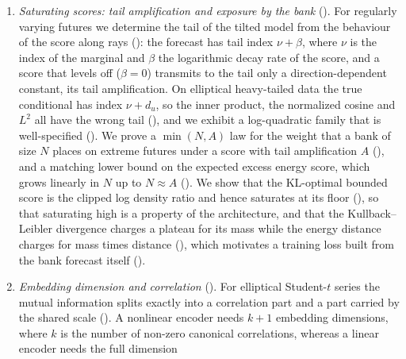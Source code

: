 \documentclass[11pt]{article}
\theoremstyle{plain}
\theoremstyle{definition}
\theoremstyle{remark}
\begin{document}
\begin{enumerate}[start=1,label={(C\arabic*)}]
       We show that the bank forecast converges as the bank grows if and only
       if the score is admissible, that it collapses onto a single future
       when the scores over the bank are regularly varying, and that a
       two-sided bound guarantees a uniform effective sample size at the cost
       of capped sharpness. This shows that the tail condition in
       \cite[Prop.~A.3]{stuart2026expressivity} is necessary rather than a
       convenience of the proof.
 \item \emph{Saturating scores: tail amplification and exposure by the bank}
       ().
       For regularly varying futures we determine the tail of the tilted
       model from the behaviour of the score along rays
       (): the forecast has tail index $\nu+\beta$, where
       $\nu$ is the index of the marginal and $\beta$ the logarithmic decay
       rate of the score, and a score that levels off ($\beta=0$) transmits
       to the tail only a direction-dependent constant, its tail
       amplification. On elliptical heavy-tailed data the true conditional
       has index $\nu+d_u$, so the inner product, the normalized cosine and
       $L^2$ all have the wrong tail (), and we exhibit
       a log-quadratic family that is well-specified
       (). We prove a $\min(N,A)$ law for the weight that
       a bank of size $N$ places on extreme futures under a score with tail
       amplification $A$ (), and a matching lower bound on
       the expected excess energy score, which grows linearly in $N$ up to
       $N\approx A$ (). We show that the KL-optimal
       bounded score is the clipped log density ratio and hence saturates at
       its floor (), so that saturating high is a property
       of the architecture, and that the Kullback--Leibler divergence
       charges a plateau for its mass while the energy distance charges for
       mass times distance (), which motivates a
       training loss built from the bank forecast itself
       ().
 \item \emph{Embedding dimension and correlation} ().
       For elliptical Student-$t$ series the mutual information splits
       exactly into a correlation part and a part carried by the shared scale
       (). A nonlinear encoder needs $k+1$ embedding
       dimensions, where $k$ is the number of non-zero canonical
       correlations, whereas a linear encoder needs the full dimension

\end{enumerate}
\end{document}
